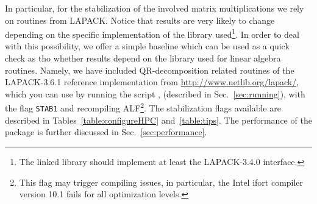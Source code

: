 In particular, for the stabilization of the involved matrix multiplications we rely on routines from LAPACK. Notice that results are very likely to change
depending on the specific implementation of the library used\footnote{The linked library should implement at least the LAPACK-3.4.0 interface.}. In order to deal with this possibility, we offer a simple baseline which can be used as a quick check as tho whether results depend on the library used for linear algebra routines. Namely, we have included QR-decomposition related routines of the LAPACK-3.6.1 reference implementation from \url{http://www.netlib.org/lapack/}, which you can use by running the script , (described in Sec.~\ref{sec:running}), with the flag \texttt{STAB1} and recompiling ALF\footnote{This flag may trigger compiling issues, in particular, the Intel ifort compiler version 10.1 fails for all optimization levels.}. The stabilization flags available are described in Tables~\ref{table:configureHPC} and~\ref{table:tips}. The performance of the package is further discussed in Sec.~\ref{sec:performance}.





